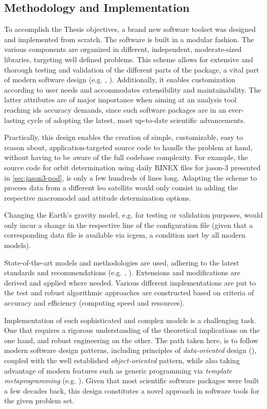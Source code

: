 \subsection{Methodology and Implementation}\label{ssec:methodology}

To accomplish the Thesis objectives, a brand new software toolset was designed and 
implemented from scratch. The software is built in a modular fashion. The various components
are organized in different, independent, moderate-sized libraries, targeting well defined
problems. This scheme allows for extensive and thorough testing and validation  of the different 
parts of the package, a vital part of modern software design (e.g. \cite{Oberkampf2010}, \cite{Meyer2008}).
Additionally, it enables customization according to user needs and accommodates  
extensibility and maintainability. The latter attributes are of major importance when 
aiming at an analysis tool reaching \gls{ids} accuracy demands, since such software packages 
are in an ever-lasting cycle of adopting the latest, most up-to-date scientific advancements.

Practically, this design enables the creation of simple, customizable, easy to 
reason about, application-targeted source code to handle the problem at hand, without 
having to be aware of the full codebase complexity. For example, the source code 
for orbit determination using daily RINEX files for \gls{jason}-3 presented in 
\autoref{sec:jason3-pod}, is only a few hundreds of lines long. Adapting the scheme 
to process data from a different \gls{leo} satellite would only consist in adding 
the respective macromodel and attitude determination options.

Changing the Earth's gravity model, e.g. for testing or validation purposes, 
would only incur a change in the respective line of the configuration file (given 
that a corresponding data file is available via \gls{icgem}, a condition met 
by all modern models).

State-of-the-art models and methodologies are used, adhering to the latest 
standards and recommendations (e.g. \cite{IdsRecommendationItrf2020}, \cite{iers2010}). 
Extensions and modifications are derived and applied where needed. Various different 
implementations are put to the test and robust algorithmic approaches are constructed 
based on criteria of accuracy and efficiency (computing speed and resources).

Implementation of such sophisticated and complex models is a challenging task. One that requires a 
rigorous understanding of the theoretical implications on the one hand, and robust 
engineering on the other. The path taken here, is to follow modern software design 
patterns, including principles of \emph{data-oriented} design (\cite{Fabian2018}), coupled with 
the well established \emph{object-oriented} pattern, while also taking advantage of 
modern features such as generic programming via \emph{template metaprogramming} 
(e.g. \cite{Gawlik2018}). Given that most scientific software packages were built 
a few decades back, this design constitutes a novel approach in software tools for 
the given problem set.

